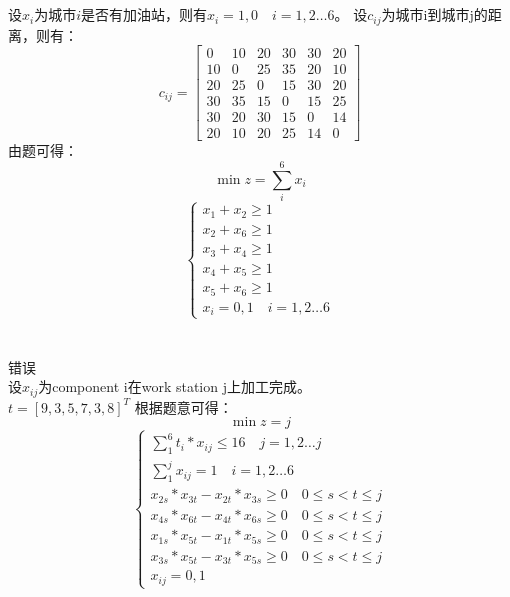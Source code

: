 \documentclass{article}
\begin{document}
\section{}
\noindent
设$x_i$为城市$i$是否有加油站，则有$x_i=1,0\quad i=1,2\dots 6$。
设$c_{ij}$为城市i到城市j的距离，则有：
\[
    c_{ij}=\begin{bmatrix}
        0 & 10 & 20 & 30 & 30 & 20 \\
        10 & 0 & 25 & 35 & 20 & 10 \\
        20 & 25 & 0 & 15 & 30 & 20 \\
        30 & 35 & 15 & 0 & 15 & 25 \\
        30 & 20 & 30 & 15 & 0 & 14 \\
        20 & 10 & 20 & 25 & 14 & 0  
    \end{bmatrix}
    \]
由题可得：
\[\min z=\sum _i^6x_i\]
\begin{equation*}
    \left\{
        \begin{array}{l}
            x_1+x_2 \geq 1 \\
            x_2+x_6 \geq 1 \\
            x_3+x_4 \geq 1 \\
            x_4+x_5 \geq 1 \\
            x_5+x_6 \geq 1 \\
            x_i=0,1 \quad i=1,2\dots 6
        \end{array}
        \right.
\end{equation*}
\section{}
\noindent
错误\\
设$x_{ij}$为component i在work station j上加工完成。\\
$t=[9,3,5,7,3,8]^{T}$
根据题意可得：\\
\[\min z=j\]
\begin{equation*}
    \left\{
        \begin{array}{l}
            \sum_{1}^{6} t_{i}*x_{ij}\leq 16 \quad j=1,2\dots j \\
            \sum_{1}^{j} x_{ij}=1 \quad i=1,2\dots 6 \\
            x_{2s}*x_{3t}-x_{2t}*x_{3s}\geq 0 \quad 0\leq s<t\leq j \\
            x_{4s}*x_{6t}-x_{4t}*x_{6s}\geq 0 \quad 0\leq s<t\leq j \\
            x_{1s}*x_{5t}-x_{1t}*x_{5s}\geq 0 \quad 0\leq s<t\leq j \\  
            x_{3s}*x_{5t}-x_{3t}*x_{5s}\geq 0 \quad 0\leq s<t\leq j \\ 
            x_{ij}=0,1          
        \end{array}
        \right.
\end{equation*}
\end{document}
